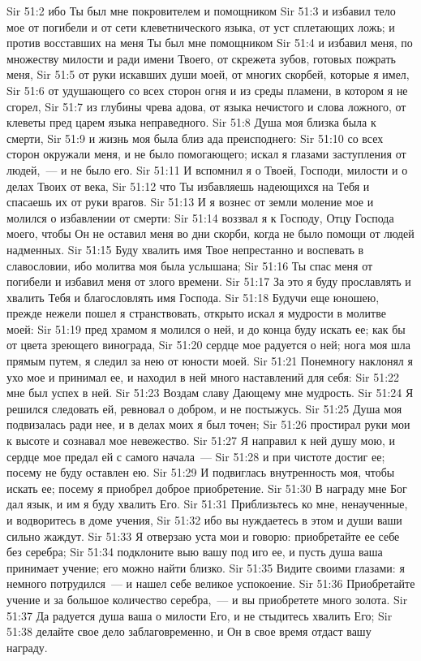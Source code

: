 \vs Sir 51:2 ибо Ты был мне покровителем и помощником
\vs Sir 51:3 и избавил тело мое от погибели и от сети клеветнического языка, от уст сплетающих ложь; и против восставших на меня Ты был мне помощником
\vs Sir 51:4 и избавил меня, по множеству милости и ради имени Твоего, от скрежета зубов, готовых пожрать меня,
\vs Sir 51:5 от руки искавших души моей, от многих скорбей, которые я имел,
\vs Sir 51:6 от удушающего со всех сторон огня и из среды пламени, в котором я не сгорел,
\vs Sir 51:7 из глубины чрева адова, от языка нечистого и слова ложного, от клеветы пред царем языка неправедного.
\vs Sir 51:8 Душа моя близка была к смерти,
\vs Sir 51:9 и жизнь моя была близ ада преисподнего:
\vs Sir 51:10 со всех сторон окружали меня, и не было помогающего; искал я глазами заступления от людей,~--- и не было его.
\vs Sir 51:11 И вспомнил я о Твоей, Господи, милости и о делах Твоих от века,
\vs Sir 51:12 что Ты избавляешь надеющихся на Тебя и спасаешь их от руки врагов.
\vs Sir 51:13 И я вознес от земли моление мое и молился о избавлении от смерти:
\vs Sir 51:14 воззвал я к Господу, Отцу Господа моего, чтобы Он не оставил меня во дни скорби, когда не было помощи от людей надменных.
\vs Sir 51:15 Буду хвалить имя Твое непрестанно и воспевать в славословии, ибо молитва моя была услышана;
\vs Sir 51:16 Ты спас меня от погибели и избавил меня от злого времени.
\vs Sir 51:17 За это я буду прославлять и хвалить Тебя и благословлять имя Господа.
\rsbpar\vs Sir 51:18 Будучи еще юношею, прежде нежели пошел я странствовать, открыто искал я мудрости в молитве моей:
\vs Sir 51:19 пред храмом я молился о ней, и до конца буду искать ее; как бы от цвета зреющего винограда,
\vs Sir 51:20 сердце мое радуется о ней; нога моя шла прямым путем, я следил за нею от юности моей.
\vs Sir 51:21 Понемногу наклонял я ухо мое и принимал ее, и находил в ней много наставлений для себя:
\vs Sir 51:22 мне был успех в ней.
\vs Sir 51:23 Воздам славу Дающему мне мудрость.
\vs Sir 51:24 Я решился следовать ей, ревновал о добром, и не постыжусь.
\vs Sir 51:25 Душа моя подвизалась ради нее, и в делах моих я был точен;
\vs Sir 51:26 простирал руки мои к высоте и сознавал мое невежество.
\vs Sir 51:27 Я направил к ней душу мою, и сердце мое предал ей с самого начала~---
\vs Sir 51:28 и при чистоте достиг ее; посему не буду оставлен ею.
\vs Sir 51:29 И подвиглась внутренность моя, чтобы искать ее; посему я приобрел доброе приобретение.
\vs Sir 51:30 В награду мне Бог дал язык, и им я буду хвалить Его.
\vs Sir 51:31 Приблизьтесь ко мне, ненаученные, и водворитесь в доме учения,
\vs Sir 51:32 ибо вы нуждаетесь в этом и души ваши сильно жаждут.
\vs Sir 51:33 Я отверзаю уста мои и говорю: приобретайте ее себе без серебра;
\vs Sir 51:34 подклоните выю вашу под иго ее, и пусть душа ваша принимает учение; его можно найти близко.
\vs Sir 51:35 Видите своими глазами: я немного потрудился~--- и нашел себе великое успокоение.
\vs Sir 51:36 Приобретайте учение и за большое количество серебра,~--- и вы приобретете много золота.
\vs Sir 51:37 Да радуется душа ваша о милости Его, и не стыдитесь хвалить Его;
\vs Sir 51:38 делайте свое дело заблаговременно, и Он в свое время отдаст вашу награду.

